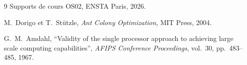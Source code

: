 \documentclass[11pt,a4paper]{article}
\begin{document}
\begin{thebibliography}{9}
Supports de cours OS02, ENSTA Paris, 2026.

M.~Dorigo et T.~St\"utzle, \emph{Ant Colony Optimization}, MIT Press, 2004.

G.~M.~Amdahl, ``Validity of the single processor approach to achieving large scale computing capabilities'', \emph{AFIPS Conference Proceedings}, vol.~30, pp.~483--485, 1967.
\end{thebibliography}
\end{document}
